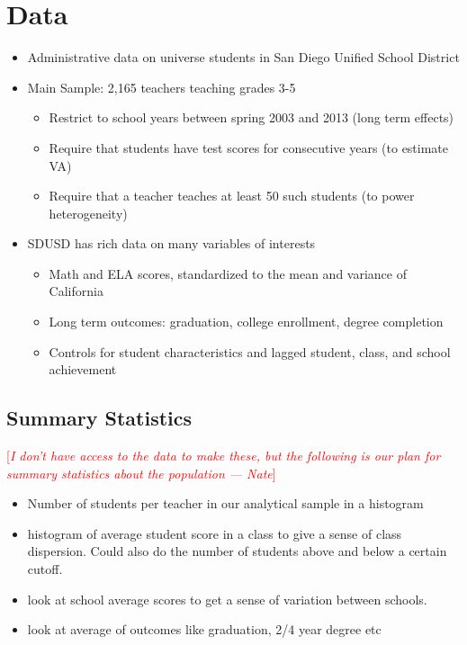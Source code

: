 \documentclass[12pt]{article}
\theoremstyle{definition}
\theoremstyle{definition}
\theoremstyle{definition}
\theoremstyle{definition}
\newcommand\cmnt[2]{\;
{\textcolor{red}{[{\em #1 --- #2}] \;}
}}
\newcommand\nate[1]{\cmnt{#1}{Nate}}
\begin{document}
\section{Data}
\label{data_section}
\begin{itemize}
    \item Administrative data on universe students in San Diego Unified School District

    \item Main Sample: 2,165 teachers teaching grades 3-5
        
    \begin{itemize}
        \item Restrict to school years between spring 2003 and 2013 (long term effects)
        \item Require that students have test scores for consecutive years (to estimate VA)
        \item Require that a teacher teaches at least 50 such students (to power heterogeneity)
    \end{itemize}    
        
    \item SDUSD has rich data on many variables of interests
        \begin{itemize}
        \item Math and ELA scores, standardized to the mean and variance of California
        \item Long term outcomes: graduation, college enrollment, degree completion
        \item Controls for student characteristics and lagged student, class, and school achievement
    \end{itemize}  
\end{itemize}

    \subsection{Summary Statistics}
    \nate{I don't have access to the data to make these, but the following is our plan for summary statistics about the population}
    \begin{itemize}
        \item Number of students per teacher in our analytical sample in a histogram 
        \item histogram of average student score in a class to give a sense of class dispersion. Could also do the number of students above and below a certain cutoff. 
        \item look at school average scores to get a sense of variation between schools. 
        \item look at average of outcomes like graduation, 2/4 year degree etc
    \end{itemize}
\end{document}
